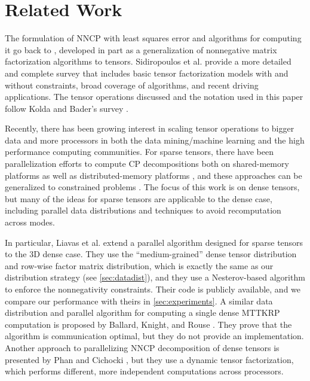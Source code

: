 
\section{Related Work} 
\label{sec:survey}

The formulation of NNCP with least squares error and algorithms for computing it go back to \cite{Paatero97,WW01}, developed in part as a generalization of nonnegative matrix factorization algorithms \cite{LS99} to tensors.
Sidiropoulos et al. \cite{SLFHPF2017} provide a more detailed and complete survey that includes basic tensor factorization models with and without constraints, broad coverage of algorithms, and recent driving applications.
The tensor operations discussed and the notation used in this paper follow Kolda and Bader's survey \cite{KB2009}. 

Recently, there has been growing interest in scaling tensor operations to bigger data and more processors in both the data mining/machine learning and the high performance computing communities. 
For sparse tensors, there have been parallelization efforts to compute CP decompositions both on shared-memory platforms \cite{SRSK2015,LCPSV17} as well as distributed-memory platforms \cite{KU16,SK16,KU18}, and these approaches can be generalized to constrained problems \cite{SBK2017}.
The focus of this work is on dense tensors, but many of the ideas for sparse tensors are applicable to the dense case, including parallel data distributions and techniques to avoid recomputation across modes.

In particular, Liavas et al. \cite{LK+17b} extend a parallel algorithm designed for sparse tensors \cite{SK16} to the 3D dense case.
They use the ``medium-grained'' dense tensor distribution and row-wise factor matrix distribution, which is exactly the same as our distribution strategy (see \cref{sec:datadist}), and they use a Nesterov-based algorithm to enforce the nonnegativity constraints.
Their code is publicly available, and we compare our performance with theirs in \cref{sec:experiments}.
A similar data distribution and parallel algorithm for computing a single dense MTTKRP computation is proposed by Ballard, Knight, and Rouse \cite{BKR17-TR}. 
They prove that the algorithm is communication optimal, but they do not provide an implementation.
Another approach to parallelizing NNCP decomposition of dense tensors is presented by Phan and Cichocki \cite{PC11}, but they use a dynamic tensor factorization, which performs different, more independent computations across processors.

